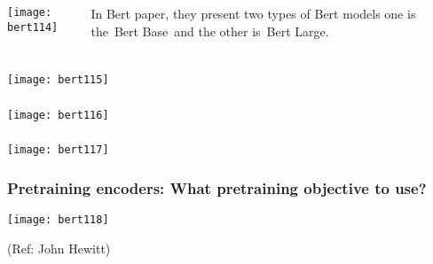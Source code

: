 \begin{frame}[fragile]\frametitle{}

\begin{columns}
    \begin{column}[T]{0.5\linewidth}
			\begin{center}
			\texttt{[image: bert114]}
			\end{center}		
		\end{column}
    \begin{column}[T]{0.5\linewidth}
In Bert paper, they present two types of Bert models one is the Bert Base and the other is Bert Large.

    \end{column}
  \end{columns}
			
\end{frame}

\begin{frame}[fragile]\frametitle{}


			\begin{center}
			\texttt{[image: bert115]}
			\end{center}		
			

\end{frame}

\begin{frame}[fragile]\frametitle{}


			\begin{center}
			\texttt{[image: bert116]}
			\end{center}		
			

\end{frame}

\begin{frame}[fragile]\frametitle{}

			\begin{center}
			\texttt{[image: bert117]}
			\end{center}		
			
\end{frame}

\begin{frame}[fragile]\frametitle{Pretraining encoders: What pretraining objective to use?}

			\begin{center}
			\texttt{[image: bert118]}
			\end{center}		
			
			{\tiny (Ref: John Hewitt)}

\end{frame}

